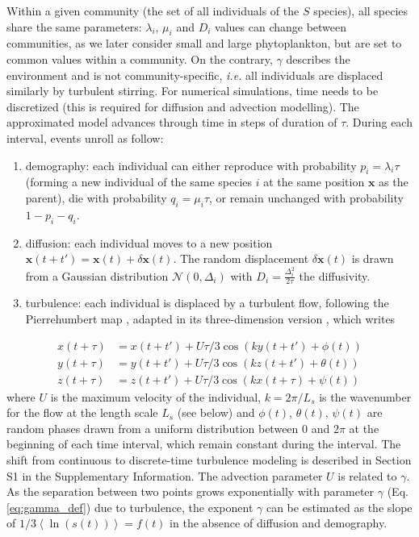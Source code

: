 \documentclass[english]{article}
\begin{document}
Within a given community (the set of all individuals of the $S$ species),
all species share the same parameters: $\lambda_{i}$, $\mu_{i}$
and $D_{i}$ values can change between communities, as we later consider
small and large phytoplankton, but are set to common values within
a community. On the contrary, $\gamma$ describes the environment
and is not community-specific, \textit{i.e.} all individuals are displaced
similarly by turbulent stirring.  For numerical simulations, time
needs to be discretized (this is required for diffusion and advection
modelling). The approximated model advances through time in steps
of duration of $\tau$. During each interval, events unroll as follow:

\begin{enumerate}
\item demography: each individual can either reproduce with probability
$p_{i}=\lambda_{i}\tau$ (forming a new individual of the same species
$i$ at the same position $\mathbf{x}$ as the parent), die with probability
$q_{i}=\mu_{i}\tau$, or remain unchanged with probability $1-p_{i}-q_{i}$.
\item diffusion: each individual moves to a new position $\mathbf{x}(t+t')=\mathbf{x}(t)+\delta\mathbf{x}(t)$.
The random displacement $\delta\mathbf{x}(t)$ is drawn from a Gaussian
distribution $\mathcal{N}(0,\Delta_{i})$ with $D_{i}=\frac{\Delta_{i}^{2}}{2\tau}$
the diffusivity.
\item turbulence: each individual is displaced by a turbulent flow, following
the Pierrehumbert map \citep{pierrehumbert_tracer_1994}, adapted
in its three-dimension version \citep{ngan_scalar_2011}, which writes
\end{enumerate}
\begin{equation}
\begin{array}{cc}
x(t+\tau) & =x(t+t')+U\tau/3\cos\left(ky(t+t')+\phi(t)\right)\\
y(t+\tau) & =y(t+t')+U\tau/3\cos\left(kz(t+t')+\theta(t)\right)\\
z(t+\tau) & =z(t+t')+U\tau/3\cos\left(kx(t+\tau)+\psi(t)\right)
\end{array}
\end{equation}
where $U$ is the maximum velocity of the individual, $k=2\pi/L_{s}$
is the wavenumber for the flow at the length scale $L_{s}$ (see below)
and $\phi(t)$, $\theta(t)$, $\psi(t)$ are random phases drawn from
a uniform distribution between $0$ and $2\pi$ at the beginning of
each time interval, which remain constant during the interval. The
shift from continuous to discrete-time turbulence modeling is described
in Section S1 in the Supplementary Information. The advection parameter
$U$ is related to $\gamma$. As the separation between two points
grows exponentially with parameter $\gamma$ (Eq. \ref{eq:gamma_def})
due to turbulence, the exponent $\gamma$ can be estimated as the
slope of $1/3\left\langle \ln(s(t))\right\rangle =f(t)$ in the absence
of diffusion and demography.
\end{document}
